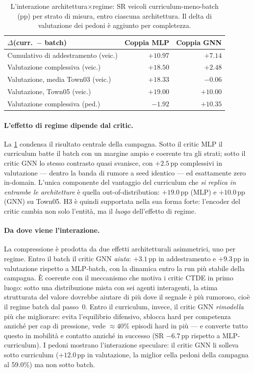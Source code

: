 \begin{table}[t]
  \centering\small
  \caption{L'interazione architettura$\times$regime: SR veicoli
  curriculum-meno-batch (pp) per strato di misura, entro ciascuna
  architettura. Il delta di valutazione dei pedoni è aggiunto per
  completezza.}

  \label{tab:interazione}
  \begin{tabular}{@{}lrr@{}}
    \toprule
    $\Delta$(curr.\ $-$ batch) & Coppia MLP & Coppia GNN \\
    \midrule
    Cumulativo di addestramento (veic.) & $+10.97$ & $+7.14$ \\
    Valutazione complessiva (veic.) & $+18.50$ & $+2.48$ \\
    Valutazione, media Town03 (veic.) & $+18.33$ & $-0.06$ \\
    Valutazione, Town05 (veic.) & $+19.00$ & $+10.00$ \\
    Valutazione complessiva (ped.) & $-1.92$ & $+10.35$ \\
    \bottomrule
  \end{tabular}
\end{table}

\paragraph{L'effetto di regime dipende dal critic.}
La \cref{tab:interazione} condensa il risultato centrale della campagna.
Sotto il critic MLP il curriculum batte il batch con un margine ampio e
coerente tra gli strati; sotto il critic GNN lo stesso contrasto quasi
svanisce, con $+2.5$\,pp complessivi in valutazione --- dentro la banda
di rumore a seed identico --- ed esattamente zero in-domain. L'unica
componente del vantaggio del curriculum che \emph{si replica in entrambe
le architetture} è quella out-of-distribution: $+19.0$\,pp (MLP) e
$+10.0$\,pp (GNN) su Town05. H3 è quindi supportata nella sua forma
forte: l'encoder del critic cambia non solo l'entità, ma il \emph{luogo}
dell'effetto di regime.

\paragraph{Da dove viene l'interazione.}
La compressione è prodotta da due effetti architetturali asimmetrici,
uno per regime. Entro il batch il critic GNN \emph{aiuta}: $+3.1$\,pp in
addestramento e $+9.3$\,pp in valutazione rispetto a MLP-batch, con la
dinamica entro la run più stabile della campagna. È coerente con il
meccanismo che motiva i critic CTDE in primo luogo: sotto una
distribuzione mista con sei agenti interagenti, la stima strutturata del
valore dovrebbe aiutare di più dove il segnale è più rumoroso, cioè il
regime batch dal passo~0. Entro il curriculum, invece, il critic GNN
\emph{rimodella} più che migliorare: evita l'equilibrio difensivo,
sblocca hard per competenza anziché per cap di pressione, vede $\approx
40$\% episodi hard in più --- e converte tutto questo in mobilità e
contatto anziché in successo (SR $-6.7$\,pp rispetto a MLP-curriculum).
I pedoni mostrano l'interazione speculare: il critic GNN li solleva
sotto curriculum ($+12.0$\,pp in valutazione, la miglior cella pedoni
della campagna al 59.0\%) ma non sotto batch.

